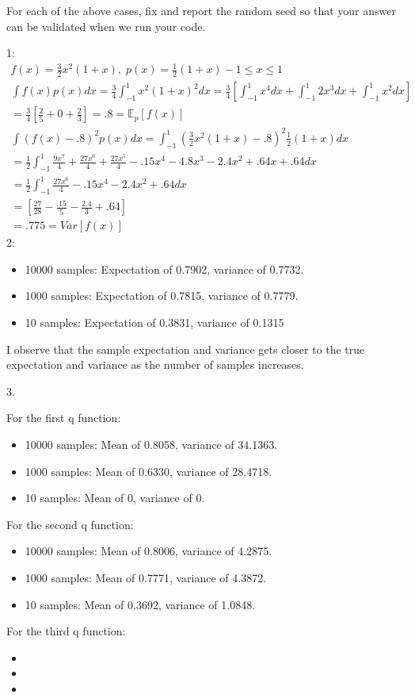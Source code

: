 \documentclass[12pt]{article}
\begin{document}
For each of the above cases, fix and report the random seed so that your answer can be validated when we run your code.
\begin{solution}
1: \begin{align*}
f(x) = \frac{3}{2}x^{2}(1+x), \;
p(x) = \frac{1}{2}(1+x) -1\leq x \leq 1 \\
\int f(x)p(x) dx = \frac{3}{4} \int_{-1}^{1} x^{2}(1+x)^{2}dx = \frac{3}{4}\left[\int_{-1}^{1} x^{4} dx + \int_{-1}^{1} 2x^{3} dx + \int_{-1}^{1} x^{2} dx \right] \\
= \frac{3}{4}\left[ \frac{2}{5} + 0+\frac{2}{3}\right] = .8 = \mathbb{E}_p[f(x)]\\
\int (f(x)-.8)^{2}p(x) dx = \int_{-1}^{1} (\frac{3}{2}x^{2}(1+x) -.8)^2\frac{1}{2}(1+x) dx \\
= \frac{1}{2} \int_{-1}^{1} \frac{9x^{7}}{4} + \frac{27x^{6}}{4} +\frac{27x^{5}}{4} -.15x^{4} - 4.8x^{3} - 2.4x^{2} + .64x + .64 dx \\ 
= \frac{1}{2} \int_{-1}^{1} \frac{27x^{6}}{4}  -.15x^{4} - 2.4x^{2} + .64 dx \\
= \left[\frac{27}{28} - \frac{.15}{5} - \frac{2.4}{3} + .64 \right] \\ 
= .775 = Var[f(x)]
\end{align*}
2:
\begin{itemize}
    \item 10000 samples: Expectation of 0.7902, variance of 0.7732.
    \item 1000 samples: Expectation of 0.7815, variance of 0.7779.
    \item 10 samples: Expectation of 0.3831, variance of 0.1315
\end{itemize}
I observe that the sample expectation and variance gets closer to the true expectation and variance as the number of samples increases.

3.

For the first q function:
\begin{itemize}
    \item 10000 samples: Mean of 0.8058, variance of 34.1363.
    \item 1000 samples: Mean of 0.6330, variance of 28.4718.
    \item 10 samples: Mean of 0, variance of 0.
\end{itemize}

For the second q function:
\begin{itemize}
    \item 10000 samples: Mean of 0.8006, variance of 4.2875.
    \item 1000 samples: Mean of 0.7771, variance of 4.3872.
    \item 10 samples: Mean of 0.3692, variance of 1.0848.
\end{itemize}

For the third q function:
\begin{itemize}
    \item 
    \item
    \item
\end{itemize}

\end{solution}
\end{document}
